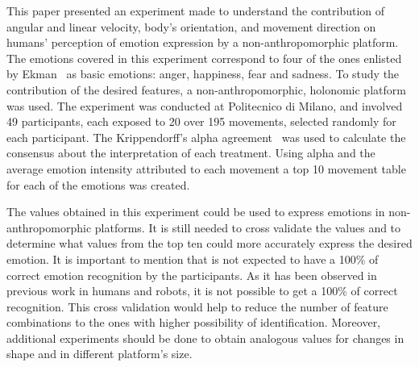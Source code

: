 This paper presented an experiment made to understand the contribution of angular and linear velocity, body's orientation, and movement direction on humans' perception of emotion expression by a non-anthropomorphic platform. The emotions covered in this experiment correspond to four of the ones enlisted by Ekman~\cite{Ekman2001} as basic emotions: anger, happiness, fear and sadness. To study the contribution of the desired features, a non-anthropomorphic, holonomic platform was used. The experiment was conducted at Politecnico di Milano, and involved 49 participants, each exposed to 20 over 195 movements, selected randomly for each participant. The Krippendorff's alpha agreement~\cite{Krippendorff2007} was used to calculate the consensus about the interpretation of each treatment. Using  alpha and the average emotion intensity attributed to each movement a top 10 movement table for each of the emotions was created.

The values obtained in this experiment could be used to express emotions in non-anthropomorphic platforms. It is still needed to cross validate the values and to determine what values from the top ten could more accurately express the desired emotion. It is important to mention that is not expected to have a 100\% of correct emotion recognition by the participants. As it has been observed in previous work in humans and robots, it is not possible to get a 100\% of correct recognition. This cross validation would help to reduce the number of feature combinations to the ones with higher possibility of identification. Moreover, additional experiments should be done to obtain analogous values for changes in shape and in different platform's size. 
